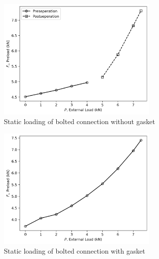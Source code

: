 \begin{figure}[h]
    \centering
    \includegraphics[width=0.7\textwidth]{Sections/Figures/without_gasket_preseperation_vs_postseperation.png}
    \caption{Static loading of bolted connection without gasket}
    \label{fig:without_gasket_loading}
\end{figure}
\begin{figure}[h]
    \centering
    \includegraphics[width=0.7\textwidth]{Sections/Figures/with_gasket_preseperation.png}
    \caption{Static loading of bolted connection with gasket}
    \label{fig:with_gasket_loading}
\end{figure}